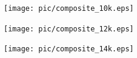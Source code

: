 \documentclass[12pt,english]{report}
\begin{document}
\begin{figure} [!htbp]
\texttt{[image: pic/composite\_10k.eps]}
\caption{} \label{allocation_results_g}
\end{figure}

\begin{figure} [!htbp]
\texttt{[image: pic/composite\_12k.eps]}
\caption{} \label{allocation_results_h}
\end{figure}


\begin{figure} [!htbp]
\texttt{[image: pic/composite\_14k.eps]}
\caption{} \label{allocation_results_i}
\end{figure}

\end{document}
